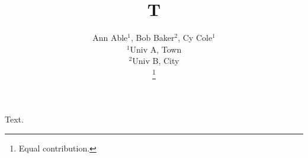 \documentclass{article}
\begin{document}
\title{T}
\author{Ann Able$^{1}$, Bob Baker$^{2}$, Cy Cole$^{1}$\\ $^{1}$Univ A, Town\\ $^{2}$Univ B, City\\ \thanks{Equal contribution.}}
\maketitle
Text.
\end{document}
